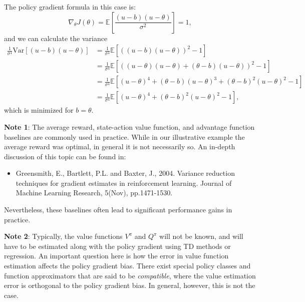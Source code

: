 The policy gradient formula in this case is:
\begin{equation*}
        \nabla_\theta J(\theta) = \mathbb{E} [\frac{(u-b)(u - \theta)}{\sigma^2}] = 1, 
\end{equation*}
and we can calculate the variance
\begin{equation*}
\begin{split}
        \frac{1}{\sigma^4}\textrm{Var}\left[(u-b)(u - \theta)\right]  
        &=\frac{1}{\sigma^4}\mathbb{E}\left[\left((u-b)(u - \theta)\right)^2 - 1\right] \\
        &=\frac{1}{\sigma^4}\mathbb{E}\left[\left((u-\theta)(u - \theta) + (\theta-b)(u - \theta)\right)^2 - 1\right] \\
        &=\frac{1}{\sigma^4}\mathbb{E}\left[(u-\theta)^4 + (\theta-b)(u - \theta)^3 + (\theta-b)^2(u - \theta)^2 - 1\right] \\
        &=\frac{1}{\sigma^4}\mathbb{E}\left[(u-\theta)^4 + (\theta-b)^2(u - \theta)^2 - 1\right],
\end{split}
\end{equation*}
which is minimized for $b=\theta$.

\textbf{Note 1}: The average reward, state-action value function, and advantage function baselines are commonly used in practice. While in our illustrative example the average reward was optimal, in general it is not necessarily so. An in-depth discussion of this topic can be found in:  
\begin{itemize}
  \item Greensmith, E., Bartlett, P.L. and Baxter, J., 2004. Variance reduction techniques for gradient estimates in reinforcement learning. Journal of Machine Learning Research, 5(Nov), pp.1471-1530.
\end{itemize}
Nevertheless, these baselines often lead to significant performance gains in practice.

\textbf{Note 2}: Typically, the value functions $V^\pi$ and $Q^\pi$ will not be known, and will have to be estimated along with the policy gradient using TD methods or regression. An important question here is how the error in value function estimation affects the policy gradient bias. There exist special policy classes and function approximators that are said to be \textit{compatible}, where the value estimation error is orthogonal to the policy gradient bias. In general, however, this is not the case. 


